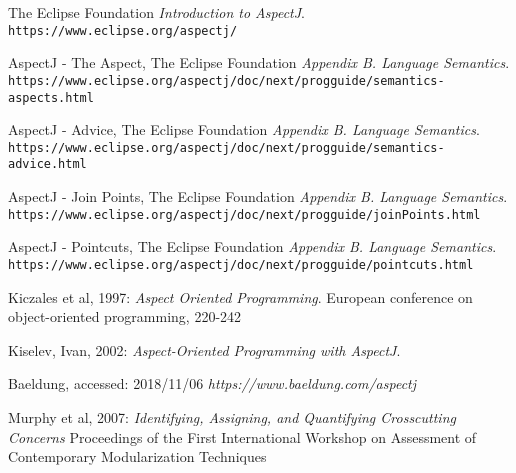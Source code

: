 \documentclass[sigconf]{acmart}
\begin{document}
\begin{thebibliography}{9}
The Eclipse Foundation
\textit{Introduction to AspectJ}. 
\\\texttt{https://www.eclipse.org/aspectj/}

AspectJ - The Aspect, The Eclipse Foundation
\textit{Appendix B. Language Semantics}. 
\\\texttt{https://www.eclipse.org/aspectj/doc/next/progguide/semantics-aspects.html}


AspectJ - Advice, The Eclipse Foundation
\textit{Appendix B. Language Semantics}. 
\\\texttt{https://www.eclipse.org/aspectj/doc/next/progguide/semantics-advice.html}

AspectJ - Join Points, The Eclipse Foundation
\textit{Appendix B. Language Semantics}. 
\\\texttt{https://www.eclipse.org/aspectj/doc/next/progguide/joinPoints.html}

AspectJ - Pointcuts, The Eclipse Foundation
\textit{Appendix B. Language Semantics}. 
\\\texttt{https://www.eclipse.org/aspectj/doc/next/progguide/pointcuts.html}

Kiczales et al, 1997: 
\textit{Aspect Oriented Programming}. 
European conference on object-oriented programming, 220-242

Kiselev, Ivan, 2002: 
\textit{Aspect-Oriented Programming with AspectJ}. 

Baeldung, accessed: 2018/11/06
\textit{https://www.baeldung.com/aspectj}

Murphy et al, 2007: 
\textit{Identifying, Assigning, and Quantifying Crosscutting Concerns}
Proceedings of the First International Workshop on Assessment of Contemporary Modularization Techniques
\end{thebibliography}
\end{document}
